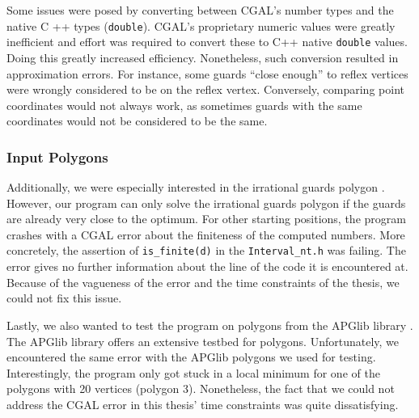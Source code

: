Some issues were posed by converting between CGAL's number types and the native C ++ types (\texttt{double}). CGAL's proprietary numeric values were greatly inefficient and effort was required to convert these to C++ native \texttt{double} values. Doing this greatly increased efficiency.
Nonetheless, such conversion resulted in approximation errors. For instance, some guards ``close enough'' to reflex vertices were wrongly considered to be on the reflex vertex. Conversely, comparing point coordinates would not always work, as sometimes guards with the same coordinates would not be considered to be the same.

\subsubsection*{Input Polygons}
Additionally, we were especially interested in the irrational guards polygon \cite{abrahamsen2021art}. However, our program can only solve the irrational guards polygon if the guards are already very close to the optimum. For other starting positions, the program crashes with a CGAL error about the finiteness of the computed numbers. More concretely, the assertion of \texttt{is\_finite(d)} in the \texttt{Interval\_nt.h} was failing. The error gives no further information about the line of the code it is encountered at. Because of the vagueness of the error and the time constraints of the thesis, we could not fix this issue.

Lastly, we also wanted to test the program on polygons from the APGlib library \cite{art-gallery-instances-page}. The APGlib library offers an extensive testbed for polygons. Unfortunately, we encountered the same error with the APGlib polygons we used for testing. Interestingly, the program only got stuck in a local minimum for one of the polygons with 20 vertices (polygon 3). Nonetheless, the fact that we could not address the CGAL error in this thesis' time constraints was quite dissatisfying.

